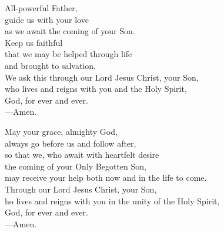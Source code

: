 \prayer


\begin{prayerverse}
All-powerful Father,\\
guide us with your love\\
as we await the coming of your Son.\\
Keep us faithful\\
that we may be helped through life\\
and brought to salvation.\\
We ask this through our Lord Jesus Christ, your Son,\\
who lives and reigns with you and the Holy Spirit,\\
God, for ever and ever.\\
{\color{red}---\thinspace}Amen.
\end{prayerverse}


\begin{prayerverse}
May your grace, almighty God,\\
 always go before us and follow after,\\
so that we, who await with heartfelt desire\\
the coming of your Only Begotten Son,\\
may receive your help both now and in the life to come.\\
Through our Lord Jesus Christ, your Son,\\
ho lives and reigns with you in the unity of the Holy Spirit,\\
God, for ever and ever.\\
{\color{red}---\thinspace}Amen.
\end{prayerverse}

